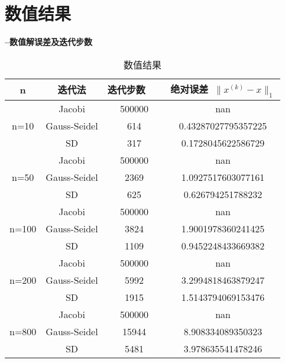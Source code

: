 \documentclass[12pt]{article}
\begin{document}
\section{数值结果}

{\bf --数值解误差及迭代步数}

\begin{table}[htb]
\begin{center}
\begin{tabular}{|c|c|c|c|} %
\hline
               n              &  迭代法 & \quad 迭代步数 $\quad \;$ &  绝对误差~\color{blue}$\|x^{(k)} -x \|_1$ \\ \hline
   \multirow{3}{*}{n=10}      & \color{blue} Jacobi  &500000  & nan \\ \hline
                              & \color{blue}  Gauss-Seidel & 614 & 0.43287027795357225\\ \hline
                              & \color{blue}  SD & 317 & 0.1728045622586729\\ \hline \hline
    \multirow{3}{*}{n=50}      & \color{blue} Jacobi  &500000  &nan  \\ \hline
                              & \color{blue}  Gauss-Seidel & 2369 & 1.0927517603077161\\ \hline
                              & \color{blue}  SD &  625 &0.626794251788232 \\ \hline \hline
     \multirow{3}{*}{n=100}      & \color{blue} Jacobi  &500000  &nan \\  \hline
                              & \color{blue}  Gauss-Seidel & 3824 &1.9001978360241425 \\  \hline
                              & \color{blue}  SD &1109  & 0.9452248433669382\\ \hline \hline       
    \multirow{3}{*}{n=200}      & \color{blue} Jacobi  & 500000 &  nan\\  \hline
                              & \color{blue}  Gauss-Seidel & 5992 & 3.2994818463879247\\  \hline
                              & \color{blue}  SD & 1915 & 1.5143794069153476\\ \hline \hline            
    \multirow{3}{*}{n=800}      & \color{blue} Jacobi  & 500000 & nan \\  \hline
                              & \color{blue}  Gauss-Seidel &15944  &8.908334089350323 \\  \hline
                              & \color{blue}  SD &  5481 & 3.978635541478246\\ \hline %

\end{tabular}
\end{center}
\caption{数值结果}
\end{table}
\end{document}
